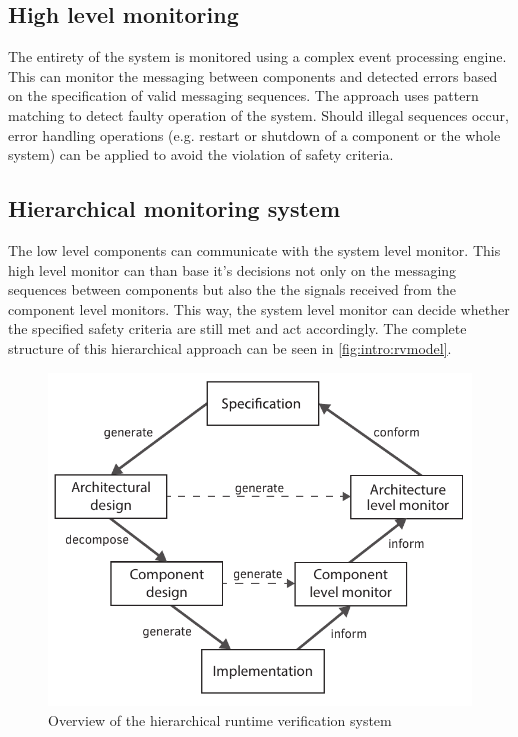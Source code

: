 \subsection{High level monitoring}
The entirety of the system is monitored using a complex event processing engine. This can monitor the messaging between components and detected errors based on the specification of valid messaging sequences. The approach uses pattern matching to detect faulty operation of the system. Should illegal sequences occur, error handling operations (e.g. restart or shutdown of a component or the whole system) can be applied to avoid the violation of safety criteria.

\subsection{Hierarchical monitoring system}
The low level components can communicate with the system level monitor. This high level monitor can than base it's decisions not only on the messaging sequences between components but also the the signals received from the component level monitors. This way, the system level monitor can decide whether the specified safety criteria are still met and act accordingly. The complete structure of this hierarchical approach can be seen in \cref{fig:intro:rvmodel}.

\begin{figure}[h]
	\centering
	\includegraphics[width=0.35\linewidth]{include/figures/chapter_1/rv_vmodel}
	\caption{Overview of the hierarchical runtime verification system}
	\label{fig:case_study:fov}
\end{figure}